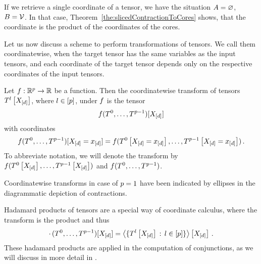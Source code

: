 If we retrieve a single coordinate of a tensor, we have the situation $A=\varnothing$, $B=\mathcal{V}$.
In that case, Theorem~\ref{the:slicedContractionToCores} shows, that the coordinate is the product of the coordinates of the cores. %

\label{sec:coordinatewiseTransforms}

Let us now discuss a scheme to perform transformations of tensors.
We call them coordinatewise, when the target tensor has the same variables as the input tensors, and each coordinate of the target tensor depends only on the respective coordinates of the input tensors. %

\begin{definition}
    \label{def:coordinateCalculus}
    Let $f: \mathbb{R}^{p} \rightarrow \mathbb{R}$ be a function.
    Then the coordinatewise transform of tensors $T^{l}\left[X_{[d]}\right]$, where $l\in[p]$, under $f$ is the tensor
    \[ f(T^{0},\ldots,T^{p-1})[X_{[d]}] \]
    with coordinates
    \[ f(T^{0},\ldots,T^{p-1})[X_{[d]}=x_{[d]}]
    = f(T^{0}\left[X_{[d]}=x_{[d]}\right],\ldots,T^{p-1}\left[X_{[d]}=x_{[d]}\right]) \, .  \]
    To abbreviate notation, we will denote the transform by $f(T^{0}\left[X_{[d]}\right],\ldots,T^{p-1}\left[X_{[d]}\right])$ and $f(T^{0},\ldots,T^{p-1})$.
\end{definition}

Coordinatewise transforms in case of $p=1$ have been indicated by ellipses in the diagrammatic depiction of contractions.

\begin{example}
    Hadamard products of tensors are a special way of coordinate calculus, where the transform is the product and thus
    \[ \cdot \, (T^{0},\ldots,T^{p-1})[X_{[d]}]
    = \left\langle \{T^{l}\left[X_{[d]}\right] \, : \, l\in[p] \}\right\rangle \left[ X_{[d]} \right] \, . \]
    These hadamard products are applied in the computation of conjunctions, as we will discuss in more detail in .
\end{example}

